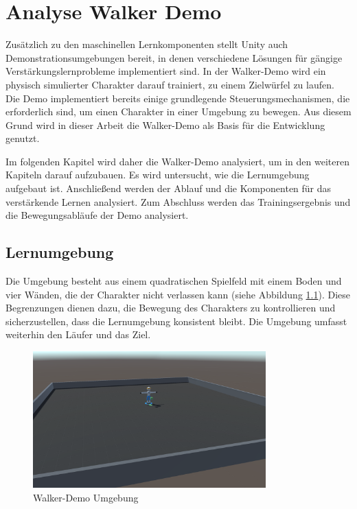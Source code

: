 \chapter{Analyse Walker Demo}
\label{sec:analyse}
Zusätzlich zu den maschinellen Lernkomponenten stellt Unity auch Demonstrationsumgebungen bereit, in denen verschiedene Lösungen für gängige Verstärkungslernprobleme implementiert sind. In der Walker-Demo wird ein physisch simulierter Charakter darauf trainiert, zu einem Zielwürfel zu laufen. Die Demo implementiert bereits einige grundlegende Steuerungsmechanismen, die erforderlich sind, um einen Charakter in einer Umgebung zu bewegen. Aus diesem Grund wird in dieser Arbeit die Walker-Demo als Basis für die Entwicklung genutzt.\cite{juliani2020}

Im folgenden Kapitel wird daher die Walker-Demo analysiert, um in den weiteren Kapiteln darauf aufzubauen. Es wird untersucht, wie die Lernumgebung aufgebaut ist. Anschließend werden der Ablauf und die Komponenten für das verstärkende Lernen analysiert. Zum Abschluss werden das Trainingsergebnis und die Bewegungsabläufe der Demo analysiert.
\section{Lernumgebung}
Die Umgebung besteht aus einem quadratischen Spielfeld mit einem Boden und vier Wänden, die der Charakter nicht verlassen kann (siehe Abbildung \ref{fig:szene_demo}). Diese Begrenzungen dienen dazu, die Bewegung des Charakters zu kontrollieren und sicherzustellen, dass die Lernumgebung konsistent bleibt. Die Umgebung umfasst weiterhin den Läufer und das Ziel.

\begin{figure}[H]
  \centering  
  \includegraphics[width=0.8\textwidth]{img/szene_demo}
  \caption{Walker-Demo Umgebung}
  \label{fig:szene_demo}
\end{figure}

